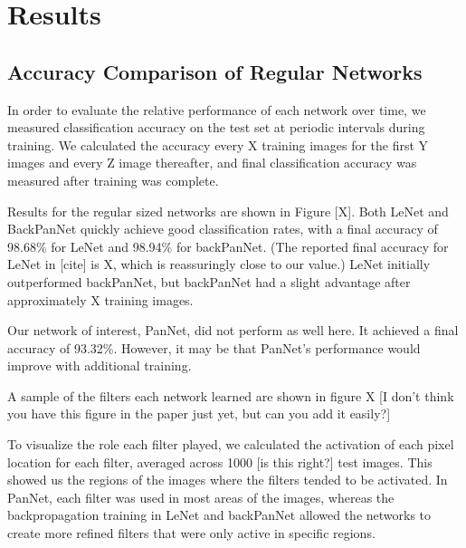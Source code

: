 \chapter{Results} %

\label{Chapter 4} %

\section{Accuracy Comparison of Regular Networks}


In order to evaluate the relative performance of each network over time, we measured classification accuracy on the test set at periodic intervals during training. We calculated the accuracy every X training images for the first Y images and every Z image thereafter, and final classification accuracy was measured after training was complete.

Results for the regular sized networks are shown in Figure [X]. Both LeNet and BackPanNet quickly achieve good classification rates, with a final accuracy of 98.68\% for LeNet and 98.94\% for backPanNet. (The reported final accuracy for LeNet in [cite] is X, which is reassuringly close to our value.) LeNet initially outperformed backPanNet, but backPanNet had a slight advantage after approximately X training images.

Our network of interest, PanNet, did not perform as well here. It achieved a final accuracy of 93.32\%. However, it may be that PanNet's performance would improve with additional training. 

A sample of the filters each network learned are shown in figure X [I don't think you have this figure in the paper just yet, but can you add it easily?]

To visualize the role each filter played, we calculated the activation of each pixel location for each filter, averaged across 1000 [is this right?] test images. This showed us the regions of the images where the filters tended to be activated. In PanNet, each filter was used in most areas of the images, whereas the backpropagation training in LeNet and backPanNet allowed the networks to create more refined filters that were only active in specific regions.



